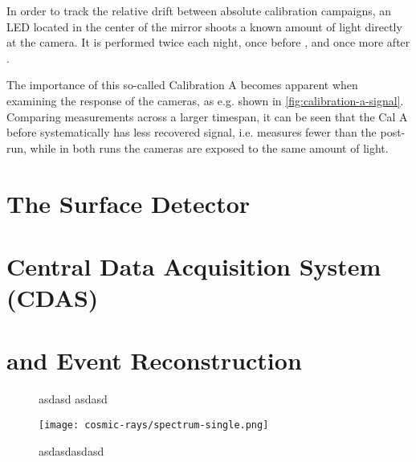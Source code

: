 In order to track the relative drift between absolute calibration campaigns, an 
LED located in the center of the mirror shoots a known amount of light directly 
at the \FD camera. It is performed twice each night, once before \DAQ, and once 
more after \DAQ.

The importance of this so-called Calibration A becomes apparent when examining the
response of the \FD cameras, as e.g. shown in \autoref{fig:calibration-a-signal}.
Comparing measurements across a larger timespan, it can be seen that the Cal A
before \DAQ systematically has less recovered signal, i.e. measures fewer \ADC
than the post-\DAQ run, while in both runs the cameras are exposed to the same 
amount of light.



\section{The Surface Detector}
\label{sec:sd}


\section{Central Data Acquisition System (CDAS)}
\label{sec:cdas}



\section{\Offline and Event Reconstruction}
\label{sec:rec}

\begin{figure}[t]
  \centering
  \hspace{0.2cm}
  \caption[]{ asdasd  asdasd}
  \label{fig:}
\end{figure}

\begin{figure}[t]
  \centering
  \texttt{[image: cosmic-rays/spectrum-single.png]}
  \caption{asdasdasdasd}
  \label{fig:asdasd}
\end{figure}


